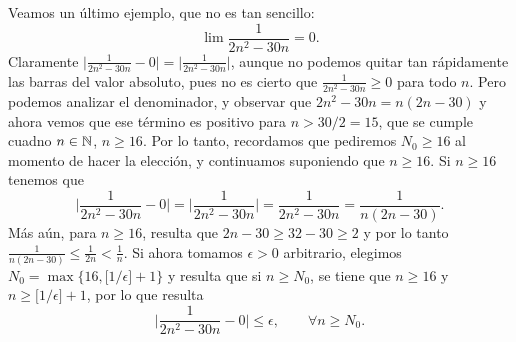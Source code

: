 \begin{example}
    Veamos un último ejemplo, que no es tan sencillo:
    \[
    \lim \frac{1}{2n^2-30n} = 0.
    \]
    Claramente $\big| \frac{1}{2n^2-30n} - 0 \big| = \big| \frac{1}{2n^2-30n} \big|$, aunque no podemos quitar tan rápidamente las barras del valor absoluto, pues no es cierto que $\frac{1}{2n^2-30n}\ge 0$ para todo $n$. 
    Pero podemos analizar el denominador, y observar que $2n^2-30n=n(2n-30)$ y ahora vemos que ese término es positivo para $n > 30/2=15$, que se cumple cuadno $n\in\mathbb{N}$, $n\ge 16$. Por lo tanto, recordamos que pediremos $N_0\ge 16$ al momento de hacer la elección, y continuamos suponiendo que $n\ge 16$.
    Si $n\ge 16$ tenemos que
    \[
        \Big| \frac{1}{2n^2-30n} - 0 \Big| = \Big| \frac{1}{2n^2-30n} \Big|
        = \frac{1}{2n^2-30n} = \frac1{n(2n-30)}.
    \]
    Más aún, para $n\ge 16$, resulta que $2n-30\ge 32-30\ge 2$ y por lo tanto $\frac1{n(2n-30)} \le \frac1{2n}<\frac1n$.
    Si ahora tomamos $\epsilon > 0$ arbitrario, elegimos $N_0 = \max\{16, \big[1/\epsilon]+1\}$ y resulta que si $n \ge N_0$, se tiene que $n\ge 16$ y $n \ge \big[1/\epsilon]+1$, por lo que resulta 
    \[
        \Big| \frac{1}{2n^2-30n} - 0 \Big| \le \epsilon,\qquad \forall n\ge N_0.
    \]
\end{example}

